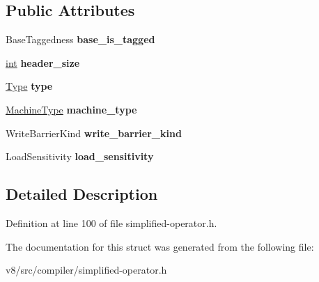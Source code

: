 \subsection*{Public Attributes}
\begin{DoxyCompactItemize}
\item 
\mbox{\label{structv8_1_1internal_1_1compiler_1_1ElementAccess_a32169a0173a4c6afc14b8b790ea64963}} 
Base\+Taggedness {\bfseries base\+\_\+is\+\_\+tagged}
\item 
\mbox{\label{structv8_1_1internal_1_1compiler_1_1ElementAccess_ae5a391794f3839d40c4d6b7cc67f39bc}} 
\mbox{\hyperlink{classint}{int}} {\bfseries header\+\_\+size}
\item 
\mbox{\label{structv8_1_1internal_1_1compiler_1_1ElementAccess_a380c8b24b49082865f35b0dfd63c0a04}} 
\mbox{\hyperlink{classv8_1_1internal_1_1compiler_1_1Type}{Type}} {\bfseries type}
\item 
\mbox{\label{structv8_1_1internal_1_1compiler_1_1ElementAccess_a154cc048cda190dce9ec53d77da91f47}} 
\mbox{\hyperlink{classv8_1_1internal_1_1MachineType}{Machine\+Type}} {\bfseries machine\+\_\+type}
\item 
\mbox{\label{structv8_1_1internal_1_1compiler_1_1ElementAccess_af7757c8f131f02cbb372cc0f7ed5e707}} 
Write\+Barrier\+Kind {\bfseries write\+\_\+barrier\+\_\+kind}
\item 
\mbox{\label{structv8_1_1internal_1_1compiler_1_1ElementAccess_ab3aac6aae207727207da32fd8e34dfb6}} 
Load\+Sensitivity {\bfseries load\+\_\+sensitivity}
\end{DoxyCompactItemize}


\subsection{Detailed Description}


Definition at line 100 of file simplified-\/operator.\+h.



The documentation for this struct was generated from the following file\+:\begin{DoxyCompactItemize}
\item 
v8/src/compiler/simplified-\/operator.\+h\end{DoxyCompactItemize}

